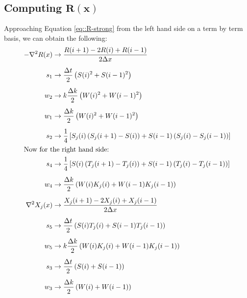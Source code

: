 \documentclass{article}
\def\grad{\mathbf\nabla}
\begin{document}
\subsection{Computing $\mathbf{R(x)}$}
\label{sec::CompR}
Approaching Equation \ref{eq::R-strong} from the left hand side on a term by term basis, we can obtain the following:
\begin{subequations}
\begin{align*}
-\grad^2R(x) &\to \frac{R(i+1)-2R(i)+R(i-1)}{2\Delta x}  \\[5pt]
s_1 &\to \frac{\Delta t}{2} \left( S(i)^2 + S(i-1)^2 \right) \\[5pt]
w_2 &\to k\frac{\Delta k}{2}\left( W(i)^2+W(i-1)^2\right)   \\[5pt]
w_1 &\to \frac{\Delta k}{2}\left(W(i)^2 + W(i-1)^2 \right)  \\[5pt]
s_2 &\to \frac{1}{4} \left[ S_j(i)\left( S_j(i+1)-S(i) \right) + S(i-1)\left(S_j(i)-S_j(i-1)\right) \right] \\
\intertext{Now for the right hand side:}
s_4 &\to \frac{1}{4} \left[ S(i) \left(T_j(i+1)-T_j(i) \right) + S(i-1)\left(T_j(i)-T_j(i-1)\right) \right] \\[5pt]
w_4 &\to \frac{\Delta k}{2} \left(W(i)K_j(i) + W(i-1)K_j(i-1) \right) \\[5pt]
\grad^2X_j(x) &\to \frac{X_j(i+1)-2X_j(i)+X_j(i-1)}{2\Delta x} \\[5pt]
s_5 &\to \frac{\Delta t}{2} \left(S(i)T_j(i) + S(i-1)T_j(i-1) \right) \\[5pt]
w_5 &\to k\frac{\Delta k}{2} \left(W(i)K_j(i) + W(i-1)K_j(i-1) \right) \\[5pt]
s_3 &\to \frac{\Delta t}{2} \left( S(i) + S(i-1) \right) \\[5pt]
w_3 &\to \frac{\Delta k}{2} \left( W(i) + W(i-1) \right)
\end{align*}
\end{subequations}
\end{document}
